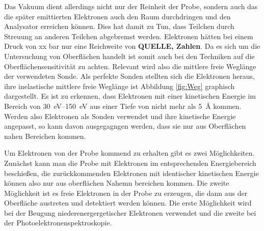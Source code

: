     Das Vakuum dient allerdings nicht nur der Reinheit der Probe, sondern auch das die später emittierten Elektronen auch den Raum durchdringen und den Analysator erreichen können.
    Dies hat damit zu Tun, dass Teilchen durch Streuung an anderen Teilchen abgebremst werden.
    Elektronen hätten bei einem Druck von xx bar nur eine Reichweite von \textbf{QUELLE, Zahlen}.
    Da es sich um die Untersuchung von Oberflächen handelt ist somit auch bei den Techniken auf die Oberflächensensitivität zu achten.
    Relevant wird also die mittlere freie Weglänge der verwendeten Sonde.
    Als perfekte Sonden stellten sich die Elektronen heraus, ihre inelastische mittlere freie Weglänge ist Abbildung \ref{fig:Weg} graphisch dargestellt.
    Es ist zu erkennen, dass Elektronen mit einer kinetischen Energie im Bereich von \SIrange{30}{150}{\electronvolt} aus einer Tiefe von nicht mehr als \SI{5}{\angstrom} kommen.
    Werden also Elektronen als Sonden verwendet und ihre kinetische Energie angepasst, so kann davon ausgegagngen werden, dass sie nur aus Oberflächen nahen Bereichen kommen.

    Um Elektronen von der Probe kommend zu erhalten gibt es zwei Möglichkeiten.
    Zunächst kann man die Probe mit Elektronen im entsprechenden Energiebereich beschießen, die zurückkommenden Elektronen mit identischer kinetischen Energie können also nur aus oberflächen Nahemn bereichen kommen.
    Die zweite Möglichkeit ist es freie Elektronen in der Probe zu erzeugen, die dann aus der Oberfläche austreten und detektiert werden können.
    Die erste Möglichkeit wird bei der Beugung niederenergergetischer Elektronen verwendet und die zweite bei der Photoelektronenspektroskopie.


